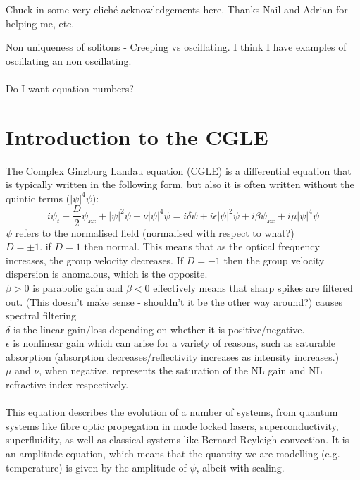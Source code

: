 \documentclass[a4paper,12pt]{report}
\begin{document}
Chuck in some very cliché acknowledgements here.
Thanks Nail and Adrian for helping me, etc. 


Non uniqueness of solitons - Creeping vs oscillating. I think I have examples of oscillating an non oscillating.
\\\\
Do I want equation numbers?




\chapter{Introduction to the CGLE}
The Complex Ginzburg Landau equation (CGLE) is a differential equation that is typically written in the following form, but also it is often written without the quintic terms ($|\psi|^4\psi$): 
$$i\psi_t +\frac{D}{2}\psi_{xx}+|\psi|^2\psi +\nu |\psi|^4\psi = i\delta \psi+i\epsilon|\psi|^2\psi +i\beta\psi_{xx}+i\mu|\psi|^4\psi$$
$\psi$ refers to the normalised field (normalised with respect to what?)\\
$D = \pm 1$. if $D=1$ then normal. This means that as the optical frequency increases, the group velocity decreases. If $D=-1$ then the group velocity dispersion is anomalous, which is the opposite.\\
$\beta>0$ is parabolic gain and $\beta<0$ effectively means that sharp spikes are filtered out. (This doesn't make sense - shouldn't it be the other way around?)
 causes spectral filtering\\
$\delta$ is the linear gain/loss depending on whether it is positive/negative. \\
$\epsilon$ is nonlinear gain which can arise for a variety of reasons, such as saturable absorption (absorption decreases/reflectivity increases as intensity increases.)\\
$\mu$ and $\nu$, when negative, represents the saturation of the NL gain and NL refractive index respectively. 
\\\\
This equation describes the evolution of a number of systems, from quantum systems like fibre optic propegation in mode locked lasers, superconductivity, superfluidity, as well as classical systems like Bernard Reyleigh convection.
It is an amplitude equation, which means that the quantity we are modelling (e.g. temperature) is given by the amplitude of $\psi$, albeit with scaling. 
\end{document}
